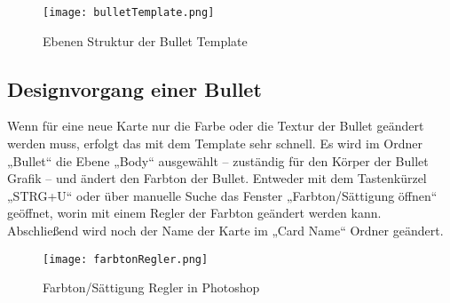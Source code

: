 \begin{figure}[H]
    \centering
    \texttt{[image: bulletTemplate.png]}
    \caption{Ebenen Struktur der Bullet Template}
\end{figure}

\subsection{Designvorgang einer Bullet}

Wenn für eine neue Karte nur die Farbe oder die Textur der Bullet geändert werden muss, erfolgt das mit dem Template sehr schnell. Es wird im Ordner „Bullet“ die Ebene „Body“ ausgewählt – zuständig für den Körper der Bullet Grafik – und ändert den Farbton der Bullet. Entweder mit dem Tastenkürzel „STRG+U“ oder über manuelle Suche das Fenster „Farbton/Sättigung öffnen“ geöffnet, worin mit einem Regler der Farbton geändert werden kann. Abschließend wird noch der Name der Karte im „Card Name“ Ordner geändert.

\begin{figure}[H]
    \centering
    \texttt{[image: farbtonRegler.png]}
    \caption{Farbton/Sättigung Regler in Photoshop}
\end{figure}

